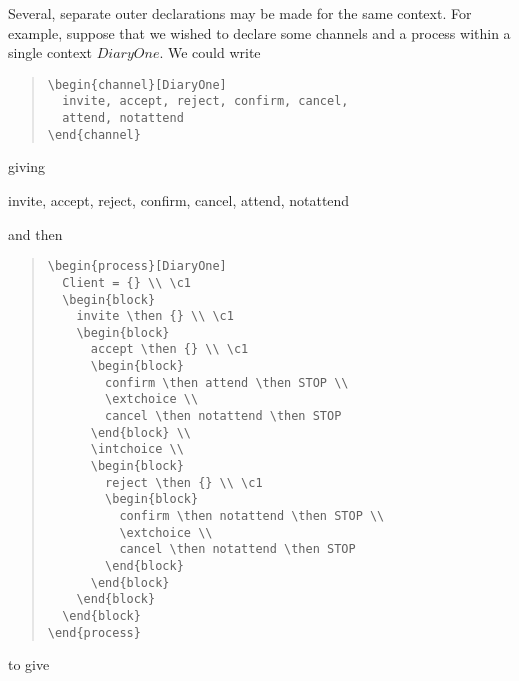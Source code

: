\documentclass[fleqn,a4paper]{article}
\begin{document}
Several, separate outer declarations may be made for the same context.
For example, suppose that we wished to declare some channels and a
process within a single context $DiaryOne$.  We could write
\begin{quote}
\begin{verbatim}
\begin{channel}[DiaryOne]
  invite, accept, reject, confirm, cancel, 
  attend, notattend
\end{channel} 
\end{verbatim}
\end{quote}
giving
\begin{channel}[DiaryOne]
  invite, accept, reject, confirm, cancel, 
  attend, notattend
\end{channel} 
and then 
\begin{quote}
\begin{verbatim}
\begin{process}[DiaryOne]
  Client = {} \\ \c1 
  \begin{block}
    invite \then {} \\ \c1 
    \begin{block}
      accept \then {} \\ \c1
      \begin{block}
        confirm \then attend \then STOP \\
        \extchoice \\
        cancel \then notattend \then STOP 
      \end{block} \\
      \intchoice \\
      \begin{block}
        reject \then {} \\ \c1
        \begin{block}
          confirm \then notattend \then STOP \\
          \extchoice \\
          cancel \then notattend \then STOP 
        \end{block}
      \end{block}
    \end{block}
  \end{block}
\end{process}
\end{verbatim}
\end{quote}
to give
\end{document}
